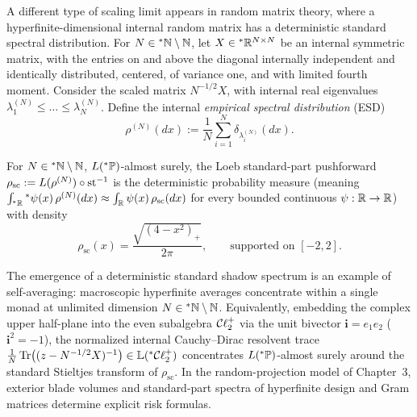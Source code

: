 A different type of scaling limit appears in random matrix theory, where a hyperfinite-dimensional internal random matrix has a deterministic standard spectral distribution. For $N \in {}^*\mathbb{N} \setminus \mathbb{N}$, let $X \in {}^*\mathbb{R}^{N\times N}$ be an internal symmetric matrix, with the entries on and above the diagonal internally independent and identically distributed, centered, of variance one, and with limited fourth moment. Consider the scaled matrix $N^{-1/2}X$, with internal real eigenvalues $\lambda_1^{(N)} \le \dots \le \lambda_N^{(N)}$. Define the internal \emph{empirical spectral distribution} (ESD)
\begin{equation}\label{eq:1.6}
\rho^{(N)}(dx) := \frac{1}{N}\sum_{i=1}^N \delta_{\lambda_i^{(N)}}(dx).
\end{equation}

\begin{theorem}\label{thm:1.4}
For $N \in {}^*\mathbb{N} \setminus \mathbb{N}$, $L({}^*\mathbb{P})$-almost surely, the Loeb standard-part pushforward $\rho_{\mathrm{sc}} := L(\rho^{(N)}) \circ \operatorname{st}^{-1}$ is the deterministic probability measure (meaning $\int_{{}^*\mathbb{R}} {}^*\psi(x)\,\rho^{(N)}(dx) \approx \int_{\mathbb{R}} \psi(x)\,\rho_{\mathrm{sc}}(dx)$ for every bounded continuous $\psi : \mathbb{R} \to \mathbb{R}$) with density
\begin{equation}\label{eq:1.7}
\rho_{\mathrm{sc}}(x) = \frac{\sqrt{(4 - x^2)_+}}{2\pi}, \qquad \text{supported on } [-2, 2].
\end{equation}
\end{theorem}

\begin{remark}\label{rem:1.5}
The emergence of a deterministic standard shadow spectrum is an example of self-averaging: macroscopic hyperfinite averages concentrate within a single monad at unlimited dimension $N \in {}^*\mathbb{N} \setminus \mathbb{N}$. Equivalently, embedding the complex upper half-plane into the even subalgebra $\mathcal{C}\ell_2^+$ via the unit bivector $\bm{i} = e_1 e_2$ ($\bm{i}^2 = -1$), the normalized internal Cauchy--Dirac resolvent trace $\frac{1}{N}\operatorname{Tr}\bigl((z - N^{-1/2}X)^{-1}\bigr) \in \mathbb{L}({}^*\mathcal{C}\ell_2^+)$ concentrates $L({}^*\mathbb{P})$-almost surely around the standard Stieltjes transform of $\rho_{\mathrm{sc}}$. In the random-projection model of Chapter~3, exterior blade volumes and standard-part spectra of hyperfinite design and Gram matrices determine explicit risk formulas.
\end{remark}


